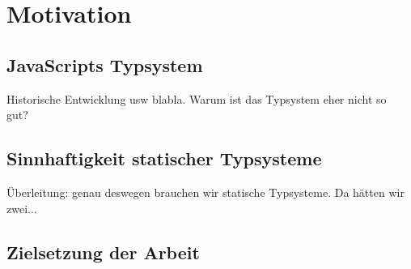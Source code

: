 \chapter{Motivation}

\section{JavaScripts Typsystem}

Historische Entwicklung usw blabla. Warum ist das Typsystem eher nicht so gut?~\autocite{severance:2012:js10days}

\section{Sinnhaftigkeit statischer Typsysteme}

Überleitung: genau deswegen brauchen wir statische Typsysteme. Da hätten wir zwei...

\section{Zielsetzung der Arbeit}

